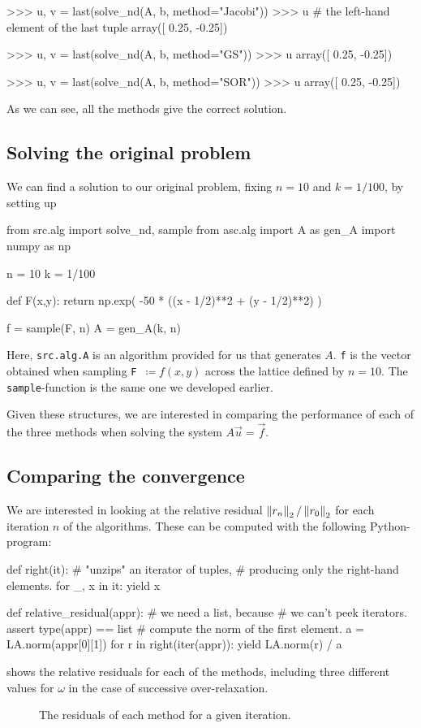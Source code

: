 \documentclass[12pt]{article}
\begin{document}
\begin{multicols*}{2}
\begin{python}
>>> u, v = last(solve_nd(A, b, method="Jacobi"))
>>> u # the left-hand element of the last tuple
array([ 0.25, -0.25])

>>> u, v = last(solve_nd(A, b, method="GS"))
>>> u
array([ 0.25, -0.25])

>>> u, v = last(solve_nd(A, b, method="SOR"))
>>> u
array([ 0.25, -0.25])
    \end{python}
    As we can see, all the methods give the correct solution.

    \subsection*{Solving the original problem}

    We can find a solution to our original problem,
    fixing $n = 10$ and $k = 1/100$, by setting up
    \begin{python}
from src.alg import solve_nd, sample
from asc.alg import A as gen_A
import numpy as np

n = 10
k = 1/100

def F(x,y):
    return np.exp(
        -50 * ((x - 1/2)**2 + (y - 1/2)**2)
    )

f = sample(F, n)
A = gen_A(k, n)
    \end{python}
    Here, {\tt src.alg.A} is an algorithm provided for us that generates $A$.
    {\tt f} is the vector obtained when sampling
    \mbox{{\tt F} $\coloneqq f(x, y)$} across the lattice defined by $n = 10$.
    The {\tt sample}-function is the same one we developed earlier.

    Given these structures, we are interested in comparing the performance of each of
    the three methods when solving the system $A \vec u = \vec f$.

    \subsection{Comparing the convergence}
    We are interested in looking at the relative residual
    $\Norm[2]{r_n} / \Norm[2]{r_0}$ for each iteration $n$ of the
    algorithms. These can be computed with the following Python-program:
    \begin{python}
def right(it):
    # "unzips" an iterator of tuples,
    # producing only the right-hand elements.
    for _, x in it: yield x

def relative_residual(appr):
    # we need a list, because
    # we can't peek iterators.
    assert type(appr) == list
    # compute the norm of the first element.
    a = LA.norm(appr[0][1])
    for r in right(iter(appr)):
        yield LA.norm(r) / a
    \end{python}
     shows the relative residuals for each of the methods,
    including three different values for $\omega$ in the case of
    successive over-relaxation.
    \begin{figure}[H]
        \centering
        
        \caption{
            The residuals of each method for a given iteration.
        }
        \label{fig:residuals}
    \end{figure}\noindent


\end{multicols*}
\end{document}
